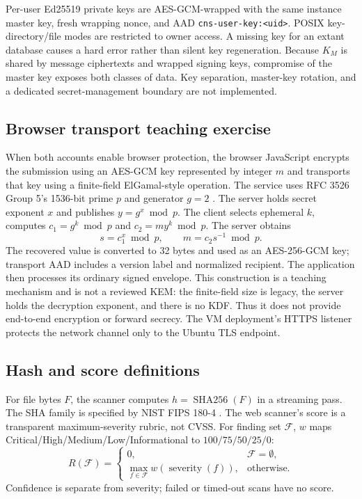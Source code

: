 \documentclass[conference]{IEEEtran}
\begin{document}
Per-user Ed25519 private keys are AES-GCM-wrapped with the same instance master key, fresh wrapping nonce, and AAD \texttt{cns-user-key:<uid>}. POSIX key-directory/file modes are restricted to owner access. A missing key for an extant database causes a hard error rather than silent key regeneration. Because $K_M$ is shared by message ciphertexts and wrapped signing keys, compromise of the master key exposes both classes of data. Key separation, master-key rotation, and a dedicated secret-management boundary are not implemented.

\subsection{Browser transport teaching exercise}
When both accounts enable browser protection, the browser JavaScript encrypts the submission using an AES-GCM key represented by integer $m$ and transports that key using a finite-field ElGamal-style operation. The service uses RFC 3526 Group 5's 1536-bit prime $p$ and generator $g=2$ \cite{rfc3526}. The server holds secret exponent $x$ and publishes $y=g^x\bmod p$. The client selects ephemeral $k$, computes $c_1=g^k\bmod p$ and $c_2=m y^k\bmod p$. The server obtains
\begin{equation}
s=c_1^x\bmod p,\qquad m=c_2s^{-1}\bmod p.
\label{eq:elgamal}
\end{equation}
The recovered value is converted to 32 bytes and used as an AES-256-GCM key; transport AAD includes a version label and normalized recipient. The application then processes its ordinary signed envelope. This construction is a teaching mechanism and is not a reviewed KEM: the finite-field size is legacy, the server holds the decryption exponent, and there is no KDF. Thus it does not provide end-to-end encryption or forward secrecy. The VM deployment's HTTPS listener protects the network channel only to the Ubuntu TLS endpoint.

\subsection{Hash and score definitions}
For file bytes $F$, the scanner computes $h=\operatorname{SHA256}(F)$ in a streaming pass. The SHA family is specified by NIST FIPS 180-4 \cite{fips180}. The web scanner's score is a transparent maximum-severity rubric, not CVSS. For finding set $\mathcal{F}$, $w$ maps Critical/High/Medium/Low/Informational to $100/75/50/25/0$:
\begin{equation}
R(\mathcal{F})=\begin{cases}0,&\mathcal{F}=\emptyset,\\\max_{f\in\mathcal{F}}w(\operatorname{severity}(f)),&\text{otherwise.}\end{cases}
\label{eq:risk}
\end{equation}
Confidence is separate from severity; failed or timed-out scans have no score.
\end{document}
